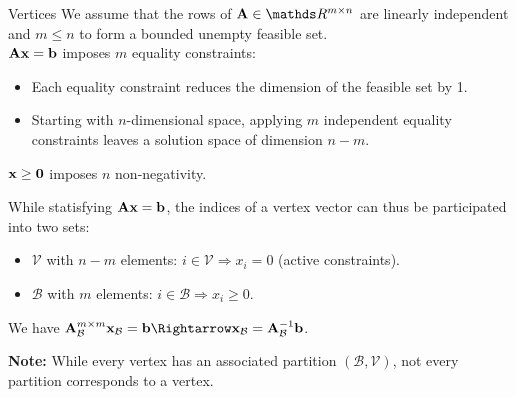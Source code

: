 \documentclass[11pt,compress,t,notes=noshow, xcolor=table]{beamer}
\begin{document}
\begin{vbframe}{Vertices}
We assume that the rows of $\Amat \in \R^{m \times n}$ are linearly independent and $m \le n$ to form a bounded unempty feasible set.\\
\lz
$\mathbf{A}\mathbf{x} = \mathbf{b}$ imposes $m$ equality constraints:
\begin{itemize}
    \item Each equality constraint reduces the dimension of the feasible set by 1.
    \item Starting with $n$-dimensional space, applying $m$ independent equality constraints leaves a solution space of dimension $n-m$.
\end{itemize}
\lz
$\mathbf{x} \ge \mathbf{0}$ imposes $n$ non-negativity.\\

\framebreak

While statisfying $\mathbf{A}\mathbf{x} = \mathbf{b}$, the indices of a vertex vector can thus be participated into two sets:
\begin{itemize}
    \item $\mathcal{V}$ with $n-m$ elements: $i \in \mathcal{V} \Rightarrow x_i = 0$ (active constraints).
    \item $\mathcal{B}$ with $m$ elements: $i \in \mathcal{B} \Rightarrow x_i \ge 0$.
\end{itemize}

\lz

We have $\Amat_{\mathcal{B}}^{m\times m}\xv_{\mathcal{B}} = \mathbf{b} \Rightarrow \xv_{\mathcal{B}} = \Amat_{\mathcal{B}}^{-1}\mathbf{b}$.

\lz
\lz

\textbf{Note:} While every vertex has an associated partition $(\mathcal{B}, \mathcal{V})$, not every partition corresponds to a vertex.
\end{vbframe}
\end{document}
